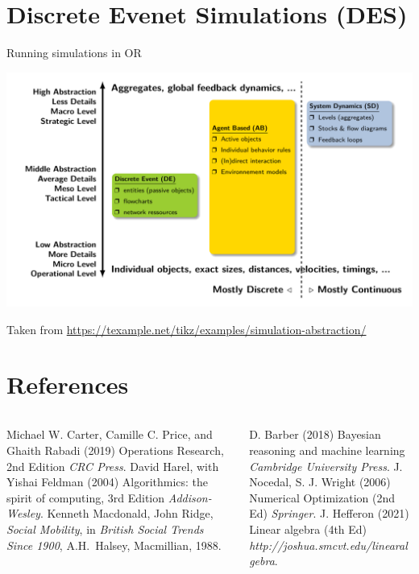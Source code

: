 \documentclass[c]{beamer}
\begin{document}
\section{Discrete Evenet Simulations (DES)}
\begin{frame}{Running simulations in OR}
  \begin{center}
    \includegraphics[width=0.7\linewidth]{../figures/simulation.pdf}
  \end{center}
  Taken from \url{https://texample.net/tikz/examples/simulation-abstraction/}
\end{frame}

\section{References}

\begin{frame}
\footnotesize
\begin{thebibliography}{99} %
  \begin{columns}[t]
    \begin{column}{.45\textwidth}
       Michael W. Carter, Camille C. Price, and Ghaith Rabadi (2019)
        \newblock Operations Research, 2nd Edition
        \newblock \emph{CRC Press}.
         David Harel, with Yishai Feldman (2004)
          \newblock Algorithmics: the spirit of computing, 3rd Edition
          \newblock \emph{Addison-Wesley}.
          Kenneth Macdonald, John Ridge,
          \emph{Social Mobility},
          in \emph{British Social Trends Since 1900},
          A.H.~Halsey,
          Macmillian, 1988.
    \end{column}
    \begin{column}{.45\textwidth}
       D. Barber (2018)
        \newblock Bayesian reasoning and machine learning
        \newblock \emph{Cambridge University Press}.
       J. Nocedal, S. J. Wright (2006)
        \newblock Numerical Optimization (2nd Ed)
        \newblock \emph{Springer}.
       J. Hefferon (2021)
        \newblock Linear algebra (4th Ed)
        \newblock \emph{http://joshua.smcvt.edu/linearalgebra}.
    \end{column}
  \end{columns}
\end{thebibliography}
\end{frame}
\end{document}
